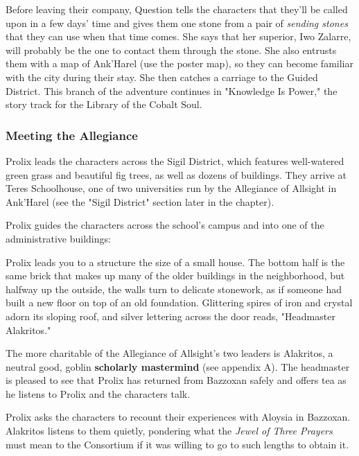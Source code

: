 \documentclass[10pt,a4paper,twoside,fancy,bg=print,twocolumn,openany,nodeprecatedcode]{dndbook}
\begin{document}
Before leaving their company, Question tells the characters that they'll be called upon in a few days' time and gives them one stone from a pair of \textit{sending stones} that they can use when that time comes. She says that her superior, Iwo Zalarre, will probably be the one to contact them through the stone. She also entrusts them with a map of Ank'Harel (use the poster map), so they can become familiar with the city during their stay. She then catches a carriage to the Guided District. This branch of the adventure continues in "Knowledge Is Power," the story track for the Library of the Cobalt Soul.

\subsubsection{Meeting the Allegiance}
Prolix leads the characters across the Sigil District, which features well-watered green grass and beautiful fig trees, as well as dozens of buildings. They arrive at Teres Schoolhouse, one of two universities run by the Allegiance of Allsight in Ank'Harel (see the "Sigil District" section later in the chapter).

Prolix guides the characters across the school's campus and into one of the administrative buildings:

\begin{DndReadAloud}{}
Prolix leads you to a structure the size of a small house. The bottom half is the same brick that makes up many of the older buildings in the neighborhood, but halfway up the outside, the walls turn to delicate stonework, as if someone had built a new floor on top of an old foundation. Glittering spires of iron and crystal adorn its sloping roof, and silver lettering across the door reads, "Headmaster Alakritos."

\end{DndReadAloud}

The more charitable of the Allegiance of Allsight's two leaders is Alakritos, a neutral good, goblin \textbf{scholarly mastermind} (see appendix A). The headmaster is pleased to see that Prolix has returned from Bazzoxan safely and offers tea as he listens to Prolix and the characters talk.

Prolix asks the characters to recount their experiences with Aloysia in Bazzoxan. Alakritos listens to them quietly, pondering what the \textit{Jewel of Three Prayers} must mean to the Consortium if it was willing to go to such lengths to obtain it.
\end{document}

